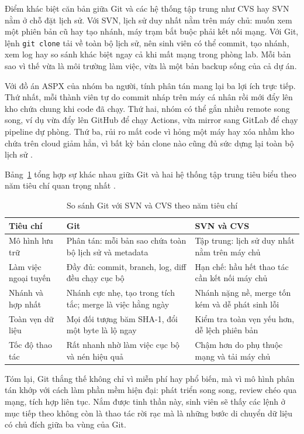 Điểm khác biệt căn bản giữa Git và các hệ thống tập trung như CVS hay SVN nằm ở chỗ đặt lịch sử. Với SVN, lịch sử duy nhất nằm trên máy chủ: muốn xem một phiên bản cũ hay tạo nhánh, máy trạm bắt buộc phải kết nối mạng. Với Git, lệnh \verb|git clone| tải về toàn bộ lịch sử, nên sinh viên có thể commit, tạo nhánh, xem log hay so sánh khác biệt ngay cả khi mất mạng trong phòng lab. Mỗi bản sao vì thế vừa là môi trường làm việc, vừa là một bản backup sống của cả dự án.

Với đồ án ASPX của nhóm ba người, tính phân tán mang lại ba lợi ích trực tiếp. Thứ nhất, mỗi thành viên tự do commit nháp trên máy cá nhân rồi mới đẩy lên kho chứa chung khi code đã chạy. Thứ hai, nhóm có thể gắn nhiều remote song song, ví dụ vừa đẩy lên GitHub để chạy Actions, vừa mirror sang GitLab để chạy pipeline dự phòng. Thứ ba, rủi ro mất code vì hỏng một máy hay xóa nhầm kho chứa trên cloud giảm hẳn, vì bất kỳ bản clone nào cũng đủ sức dựng lại toàn bộ lịch sử \cite{atlassiangit}.

Bảng~\ref{tab:c2-1-so-sanh} tổng hợp sự khác nhau giữa Git và hai hệ thống tập trung tiêu biểu theo năm tiêu chí quan trọng nhất \cite{progit}.

\begin{table}[H]
\centering
\begin{tabular}{p{3.2cm}p{4.2cm}p{4.2cm}}
\toprule
Tiêu chí & Git & SVN và CVS \\
\midrule
Mô hình lưu trữ & Phân tán: mỗi bản sao chứa toàn bộ lịch sử và metadata & Tập trung: lịch sử duy nhất nằm trên máy chủ \\
Làm việc ngoại tuyến & Đầy đủ: commit, branch, log, diff đều chạy cục bộ & Hạn chế: hầu hết thao tác cần kết nối máy chủ \\
Nhánh và hợp nhất & Nhánh cực nhẹ, tạo trong tích tắc; merge là việc hằng ngày & Nhánh nặng nề, merge tốn kém và dễ phát sinh lỗi \\
Toàn vẹn dữ liệu & Mọi đối tượng băm SHA-1, đổi một byte là lộ ngay & Kiểm tra toàn vẹn yếu hơn, dễ lệch phiên bản \\
Tốc độ thao tác & Rất nhanh nhờ làm việc cục bộ và nén hiệu quả & Chậm hơn do phụ thuộc mạng và tải máy chủ \\
\bottomrule
\end{tabular}
\caption{So sánh Git với SVN và CVS theo năm tiêu chí}
\label{tab:c2-1-so-sanh}
\end{table}

Tóm lại, Git thắng thế không chỉ vì miễn phí hay phổ biến, mà vì mô hình phân tán khớp với cách làm phần mềm hiện đại: phát triển song song, review chéo qua mạng, tích hợp liên tục. Nắm được tinh thần này, sinh viên sẽ thấy các lệnh ở mục tiếp theo không còn là thao tác rời rạc mà là những bước di chuyển dữ liệu có chủ đích giữa ba vùng của Git.

